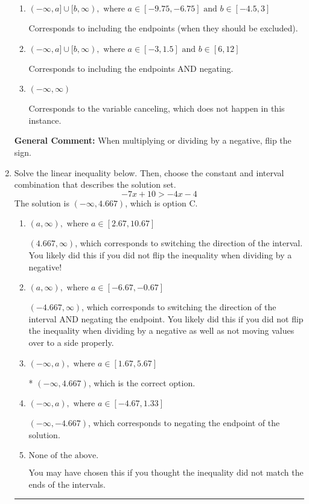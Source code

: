 \documentclass{extbook}[14pt]
\newcommand{\litem}[1]{\item #1

\rule{\textwidth}{0.4pt}}
\begin{document}
\begin{enumerate}
{\begin{enumerate}[label=\Alph*.]
Corresponds to inverting the inequality and negating the solution.
\item \( (-\infty, a] \cup [b, \infty), \text{ where } a \in [-9.75, -6.75] \text{ and } b \in [-4.5, 3] \)

Corresponds to including the endpoints (when they should be excluded).
\item \( (-\infty, a] \cup [b, \infty), \text{ where } a \in [-3, 1.5] \text{ and } b \in [6, 12] \)

Corresponds to including the endpoints AND negating.
\item \( (-\infty, \infty) \)

Corresponds to the variable canceling, which does not happen in this instance.
\end{enumerate}

\textbf{General Comment:} When multiplying or dividing by a negative, flip the sign.
}
\litem{
Solve the linear inequality below. Then, choose the constant and interval combination that describes the solution set.
\[ -7x + 10 > -4x -4 \]The solution is \( (-\infty, 4.667) \), which is option C.\begin{enumerate}[label=\Alph*.]
\item \( (a, \infty), \text{ where } a \in [2.67, 10.67] \)

 $(4.667, \infty)$, which corresponds to switching the direction of the interval. You likely did this if you did not flip the inequality when dividing by a negative!
\item \( (a, \infty), \text{ where } a \in [-6.67, -0.67] \)

 $(-4.667, \infty)$, which corresponds to switching the direction of the interval AND negating the endpoint. You likely did this if you did not flip the inequality when dividing by a negative as well as not moving values over to a side properly.
\item \( (-\infty, a), \text{ where } a \in [1.67, 5.67] \)

* $(-\infty, 4.667)$, which is the correct option.
\item \( (-\infty, a), \text{ where } a \in [-4.67, 1.33] \)

 $(-\infty, -4.667)$, which corresponds to negating the endpoint of the solution.
\item \( \text{None of the above}. \)

You may have chosen this if you thought the inequality did not match the ends of the intervals.
\end{enumerate}

}
\end{enumerate}
\end{document}

